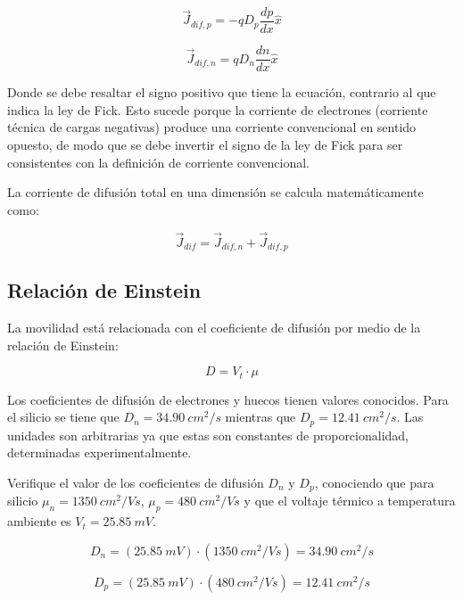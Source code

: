\[ \vec{J}_{dif,p} = - q D_p \dfrac{dp}{dx} \hat{x} \]

\[ \vec{J}_{dif,n} = q D_n \dfrac{dn}{dx} \hat{x} \]

Donde se debe resaltar el signo positivo que tiene la ecuación, contrario al que indica la ley de Fick. Esto sucede porque la corriente de electrones (corriente técnica de cargas negativas) produce una corriente convencional en sentido opuesto, de modo que se debe invertir el signo de la ley de Fick para ser consistentes con la definición de corriente convencional.

La corriente de difusión total en una dimensión se calcula matemáticamente como:

\[ \vec{J}_{dif} = \vec{J}_{dif,n} + \vec{J}_{dif,p} \]

\subsection{Relación de Einstein}

La movilidad está relacionada con el coeficiente de difusión por medio de la relación de Einstein:

\[ D = V_t \cdot \mu \]

Los coeficientes de difusión de electrones y huecos tienen valores conocidos. Para el silicio se tiene que $D_n=34.90\ cm^2/s$ mientras que $D_p=12.41\ cm^2/s$. Las unidades son arbitrarias ya que estas son constantes de proporcionalidad, determinadas experimentalmente.

\begin{ejemplo}
Verifique el valor de los coeficientes de difusión $D_n$ y $D_p$, conociendo que para silicio $\mu_n = 1350\ cm^2/Vs$, $\mu_p = 480\ cm^2/Vs$ y que el voltaje térmico a temperatura ambiente es $V_t = 25.85\ mV$.
\end{ejemplo}

\begin{solucion}
\[ D_n = (25.85\ mV) \cdot (1350\ cm^2/Vs) = 34.90\ cm^2/s \]

\[ D_p = (25.85\ mV) \cdot (480\ cm^2/Vs) = 12.41\ cm^2/s \]
\end{solucion}


